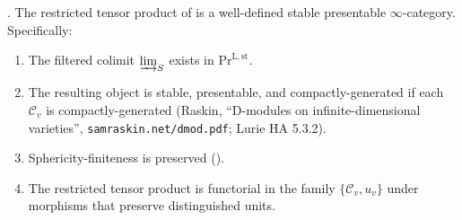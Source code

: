 \begin{theorem}[\((L_{1})\) closed]
\label{v4-arith:acd:thm:L1-closed}
\ClaimStatusProvedHere. The restricted tensor product of
 is a well-defined stable
presentable \(\infty\)-category. Specifically:
\begin{enumerate}
\item The filtered colimit \(\varinjlim_{S}\) exists in
\(\mathrm{Pr}^{\mathrm{L,st}}\).
\item The resulting object is stable, presentable, and
compactly-generated if each \(\mathcal{C}_{v}\) is compactly-generated
(Raskin, ``D-modules on infinite-dimensional varieties'',
\texttt{samraskin.net/dmod.pdf}; Lurie HA 5.3.2).
\item Sphericity-finiteness is preserved
().
\item The restricted tensor product is functorial in the family
\(\{\mathcal{C}_{v}, u_{v}\}\) under morphisms that preserve
distinguished units.
\end{enumerate}
\end{theorem}

